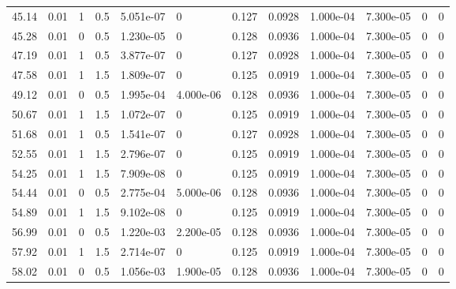 \documentclass[preview]{standalone}
\begin{document}
{{\begin{tabular}{L{1.2cm}C{1.2cm} C{0.3cm}C{0.5cm} C{1.4cm}C{1.4cm} C{1.4cm}C{1.4cm} C{1.6cm}C{1.6cm} C{1.6cm}C{1.6cm}}
  45.14  &  0.01  & 1     & 0.5 &  5.051e-07  & 0  &  0.127&   0.0928& 1.000e-04 & 7.300e-05   &  0 & 0  \\ 
  45.28  &  0.01  & 0     & 0.5 &  1.230e-05  & 0  &  0.128&   0.0936& 1.000e-04 & 7.300e-05   &  0 & 0  \\ 
  47.19  &  0.01  & 1     & 0.5 &  3.877e-07  & 0  &  0.127&   0.0928& 1.000e-04 & 7.300e-05   &  0 & 0  \\ 
  47.58  &  0.01  & 1     & 1.5 &  1.809e-07  & 0  &  0.125&   0.0919& 1.000e-04 & 7.300e-05   &  0 & 0  \\ 
  49.12  &  0.01  & 0     & 0.5 &  1.995e-04  & 4.000e-06  &  0.128&   0.0936& 1.000e-04 & 7.300e-05   &  0 & 0  \\ 
  50.67  &  0.01  & 1     & 1.5 &  1.072e-07  & 0  &  0.125&   0.0919& 1.000e-04 & 7.300e-05   &  0 & 0  \\ 
  51.68  &  0.01  & 1     & 0.5 &  1.541e-07  & 0  &  0.127&   0.0928& 1.000e-04 & 7.300e-05   &  0 & 0  \\ 
  52.55  &  0.01  & 1     & 1.5 &  2.796e-07  & 0  &  0.125&   0.0919& 1.000e-04 & 7.300e-05   &  0 & 0  \\ 
  54.25  &  0.01  & 1     & 1.5 &  7.909e-08  & 0  &  0.125&   0.0919& 1.000e-04 & 7.300e-05   &  0 & 0  \\ 
  54.44  &  0.01  & 0     & 0.5 &  2.775e-04  & 5.000e-06  &  0.128&   0.0936& 1.000e-04 & 7.300e-05   &  0 & 0  \\ 
  54.89  &  0.01  & 1     & 1.5 &  9.102e-08  & 0  &  0.125&   0.0919& 1.000e-04 & 7.300e-05   &  0 & 0  \\ 
  56.99  &  0.01  & 0     & 0.5 &  1.220e-03  & 2.200e-05  &  0.128&   0.0936& 1.000e-04 & 7.300e-05   &  0 & 0  \\ 
  57.92  &  0.01  & 1     & 1.5 &  2.714e-07  & 0  &  0.125&   0.0919& 1.000e-04 & 7.300e-05   &  0 & 0  \\ 
  58.02  &  0.01  & 0     & 0.5 &  1.056e-03  & 1.900e-05  &  0.128&   0.0936& 1.000e-04 & 7.300e-05   &  0 & 0  \\ 
\hline 
\end{tabular} 

}}
\end{document}
